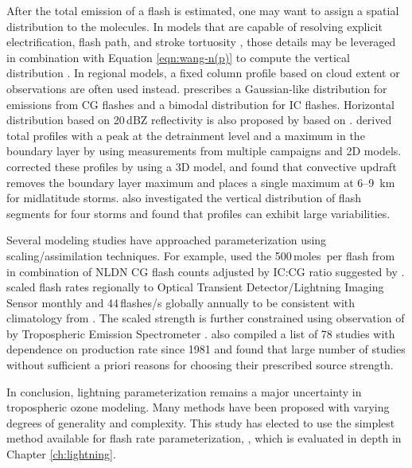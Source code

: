 	After the total emission of a flash is estimated, one may want to assign a spatial distribution to the molecules. In models that are capable of resolving explicit electrification, flash path, and stroke tortuosity \citep[e.g.][]{Mansell:2002kx}, those details may be leveraged in combination with Equation \ref{eqn:wang-n(p)} to compute the vertical distribution \citep{Barthe:2007fk}. In regional models, a fixed column profile based on cloud extent or observations are often used instead.  \citet{Decaria:2000kl} prescribes a Gaussian-like distribution for emissions from CG flashes and a bimodal distribution for IC flashes. Horizontal distribution based on 20\,\unit{dBZ} reflectivity is also proposed by \citet{DeCaria:2005tg} based on \citet{MacGorman:1998fk}. \citet{Pickering:1998sh} derived total {\lnox} profiles with a peak at the detrainment level and a maximum in the boundary layer by using measurements from multiple campaigns and 2D models. \citet{Ott:2010lo} corrected these profiles by using a 3D model, and found that convective updraft removes the boundary layer maximum and places a single maximum at 6--9 \,\unit{km} for midlatitude storms. \citet{Hansen:2010fk} also investigated the vertical distribution of flash segments for four storms and found that profiles can exhibit large variabilities.
	
	Several modeling studies have approached {\lnox} parameterization using scaling/assimilation techniques. For example, \citet{Hudman:2007fu} used the 500\,\unit{moles}\, per flash from \citet{Ott:2010lo} in combination of NLDN CG flash counts adjusted by IC:CG ratio suggested by \citet{Boccippio:2001ys}. \citet{Jourdain:2010tw} scaled flash rates regionally to Optical Transient Detector/Lightning Imaging Sensor \citep[OTD/LIS][]{Boccippio:2000mi} monthly and 44\,\unit{flashes/s} globally annually to be consistent with climatology from \citet{Christian:2003kx}. The scaled {\lnox} strength is further constrained using observation of  by Tropospheric Emission Spectrometer \citep[TES][]{Beer:2006fk}. \citet[][Table 24]{Schumann:2007fk} also compiled a list of 78 studies with dependence on {\lnox} production rate since 1981 and found that large number of studies without sufficient a priori reasons for choosing their prescribed source strength.
	
\quad

\noindent In conclusion, lightning parameterization remains a major uncertainty in tropospheric ozone modeling. Many methods have been proposed with varying degrees of generality and complexity. This study has elected to use the simplest method available for flash rate parameterization, {\ie} \citet{Price:1992wb}, which is evaluated in depth in Chapter \ref{ch:lightning}.

